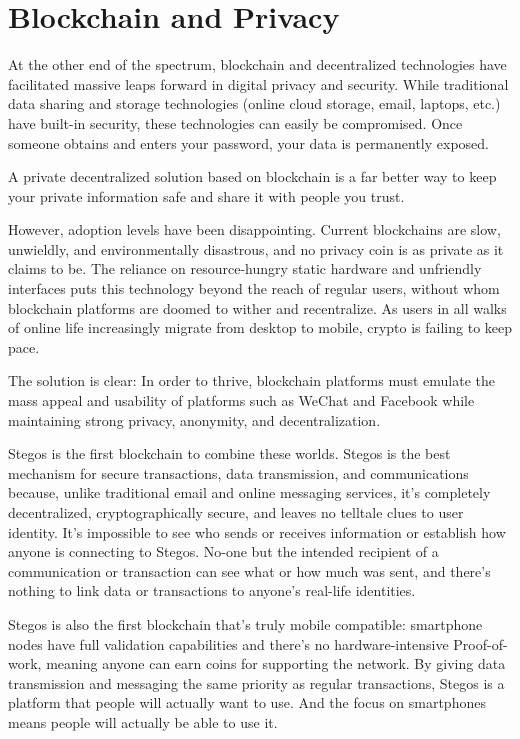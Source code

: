 \documentclass[8pt,fleqn,openany]{book}
\begin{document}
\section{Blockchain and Privacy}
At the other end of the spectrum, blockchain and decentralized technologies have facilitated massive leaps forward in digital privacy and security. While traditional data sharing and storage technologies (online cloud storage, email, laptops, etc.) have built-in security, these technologies can easily be compromised. Once someone obtains and enters your password, your data is permanently exposed.

A private decentralized solution based on blockchain is a far better way to keep your private information safe and share it with people you trust.

However, adoption levels have been disappointing. Current blockchains are slow, unwieldly, and environmentally disastrous, and no privacy coin is as private as it claims to be. The reliance on resource-hungry static hardware and unfriendly interfaces puts this technology beyond the reach of regular users, without whom blockchain platforms are doomed to wither and recentralize. As users in all walks of online life increasingly migrate from desktop to mobile, crypto is failing to keep pace. 

The solution is clear: In order to thrive, blockchain platforms must emulate the mass appeal and usability of platforms such as WeChat and Facebook while maintaining strong privacy, anonymity, and decentralization.

Stegos is the first blockchain to combine these worlds. Stegos is the best mechanism for secure transactions, data transmission, and communications because, unlike traditional email and online messaging services, it’s completely decentralized, cryptographically secure, and leaves no telltale clues to user identity. It’s impossible to see who sends or receives information or establish how anyone is connecting to Stegos. No-one but the intended recipient of a communication or transaction can see what or how much was sent, and there’s nothing to link data or transactions to anyone’s real-life identities.

 Stegos is also the first blockchain that's truly mobile compatible: smartphone nodes have full validation capabilities and there's no hardware-intensive Proof-of-work, meaning anyone can earn coins for supporting the network. By giving data transmission and messaging the same priority as regular transactions, Stegos is a platform that people will actually want to use. And the focus on smartphones means people will actually be able to use it.
\end{document}
